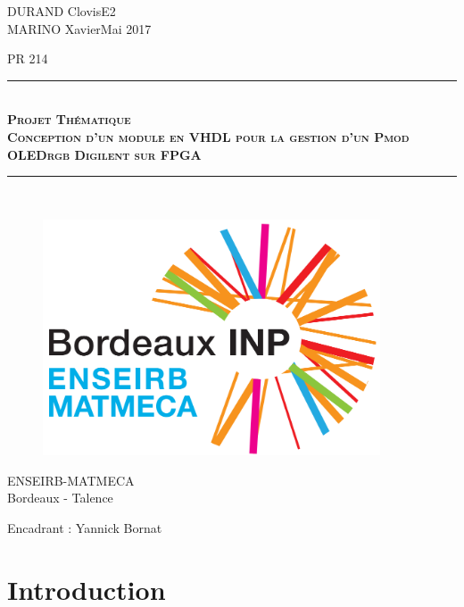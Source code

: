\documentclass[11pt]{article}
\newcommand{\HRule}{\rule{\linewidth}{0.5mm}}
\begin{document}
\thispagestyle{empty}

\noindent 
DURAND Clovis\hfill{E2} \\ MARINO Xavier\hfill{Mai 2017}



\vspace{1cm}
\begin{center}
\Large{PR 214} %
\HRule \\[0.1cm]
{\textsc{\LARGE \textbf{Projet Thématique\\ Conception d'un module en VHDL pour la gestion d'un Pmod OLEDrgb Digilent sur FPGA}}}\\
\HRule\\[01cm]
\end{center}
\vspace{1cm}

\begin{figure}[htbp]
\begin{center}
\includegraphics[width=10cm]{background.png}
\end{center}
\end{figure}

\vspace{0.5cm}
\begin{center}
\Large{ENSEIRB-MATMECA \\ Bordeaux - Talence}
\end{center}

\vspace{0.5cm}
Encadrant : Yannick Bornat

\newpage
\tableofcontents
\listoffigures
\newpage 

\setcounter{section}{-1}

\section{Introduction}
\end{document}
